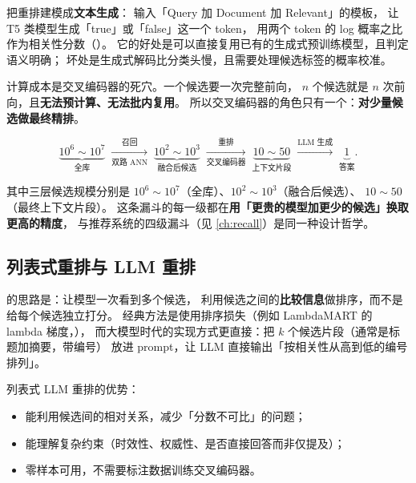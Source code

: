  把重排建模成\textbf{文本生成}：
输入「Query 加 Document 加 Relevant」的模板，
让 T5 类模型生成「true」或「false」这一个 token，
用两个 token 的 log 概率之比作为相关性分数（\cite{raffel2020t5}）。
它的好处是可以直接复用已有的生成式预训练模型，且判定语义明确；
坏处是生成式解码比分类头慢，且需要处理候选标签的概率校准。

计算成本是交叉编码器的死穴。一个候选要一次完整前向，
$n$ 个候选就是 $n$ 次前向，且\textbf{无法预计算、无法批内复用}。
所以交叉编码器的角色只有一个：\textbf{对少量候选做最终精排}。

\begin{equation}
\underbrace{10^6 \sim 10^7}_{\text{全库}}
\;\xrightarrow[\text{双路 ANN}]{\text{召回}}\;
\underbrace{10^2 \sim 10^3}_{\text{融合后候选}}
\;\xrightarrow[\text{交叉编码器}]{\text{重排}}\;
\underbrace{10 \sim 50}_{\text{上下文片段}}
\;\xrightarrow{\text{LLM 生成}}\;
\underbrace{1}_{\text{答案}} .
\label{eq:cascade-funnel}
\end{equation}

其中三层候选规模分别是 $10^6 \sim 10^7$（全库）、$10^2 \sim 10^3$（融合后候选）、
$10 \sim 50$（最终上下文片段）。
这条漏斗的每一级都在\textbf{用「更贵的模型加更少的候选」换取更高的精度}，
与推荐系统的四级漏斗（见 \cref{ch:recall}）是同一种设计哲学。

\subsection{列表式重排与 LLM 重排}

 的思路是：让模型一次看到多个候选，
利用候选之间的\textbf{比较信息}做排序，而不是给每个候选独立打分。
经典方法是使用排序损失（例如 LambdaMART 的 lambda 梯度，\cite{wu2010lambdamart}），
而大模型时代的实现方式更直接：把 $k$ 个候选片段（通常是标题加摘要，带编号）
放进 prompt，让 LLM 直接输出「按相关性从高到低的编号排列」。

列表式 LLM 重排的优势：
\begin{itemize}
  \item 能利用候选间的相对关系，减少「分数不可比」的问题；
  \item 能理解复杂约束（时效性、权威性、是否直接回答而非仅提及）；
  \item 零样本可用，不需要标注数据训练交叉编码器。
\end{itemize}

